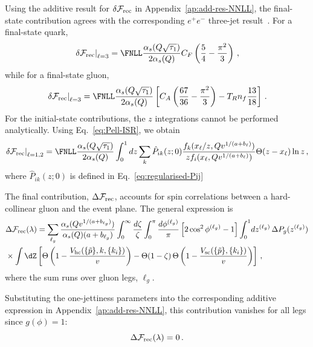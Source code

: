 Using the additive result for $\delta\mathcal{F}_{\rm rec}$ in
Appendix~\ref{ap:add-res-NNLL}, the final-state contribution agrees
with the corresponding $e^+e^-$ three-jet result~\cite{Arpino:2019ozn}.
For a final-state quark,
\begin{equation}
  \label{eq:dFrec-tau_1q}
  \left.\delta\mathcal{F}_{\rm rec}\right|_{\ell=3}
  =
  \FNLL
  \frac{\alpha_s(Q\sqrt{\tau_1})}{2\alpha_s(Q)}
  C_F\left(\frac{5}{4}-\frac{\pi^2}{3}\right)\,,
\end{equation}
while for a final-state gluon,
\begin{equation}
  \label{eq:dFrec-tau_1g}
  \left.\delta\mathcal{F}_{\rm rec}\right|_{\ell=3}
  =
  \FNLL
  \frac{\alpha_s(Q\sqrt{\tau_1})}{2\alpha_s(Q)}
  \left[
  C_A\left(\frac{67}{36}-\frac{\pi^2}{3}\right)
  -T_Rn_f\frac{13}{18}
  \right]\,.
\end{equation}
For the initial-state contributions, the $z$ integrations cannot
be performed analytically. Using Eq.~\eqref{eq:Pell-ISR}, we obtain
\begin{equation}
  \label{eq:dFrec-ISR-1jet}
  \left.\delta\mathcal{F}_{\rm rec}\right|_{\ell=1,2}
  =
  \FNLL
  \frac{\alpha_s(Q\sqrt{\tau_1})}{2\alpha_s(Q)}
  \int_0^1 dz \sum_k \hat P_{ik}(z;0)
  \frac{f_k(x_\ell/z,Qv^{1/(a+b_\ell)})}
  {z f_i(x_\ell,Qv^{1/(a+b_\ell)})}
  \Theta(z-x_\ell)\ln z\,,
\end{equation}
where $\hat P_{ik}(z;0)$ is defined in Eq.~\eqref{eq:regularised-Pij}

The final contribution, $\Delta\mathcal{F}_{\rm rec}$, 
accounts for spin correlations between a hard-collinear gluon 
and the event plane. The general expression is
\begin{equation}
\label{eq:DFrec-general}
\begin{aligned}
  &\Delta\mathcal{F}_{\mathrm{rec}}(\lambda) =
\sum_{\ell_g}\frac{\alpha_s(Qv^{1/(a+b_{\ell_g})})}{\alpha_s(Q)(a+b_{\ell_g})}\int_0^\infty \frac{d\zeta}{\zeta}
\int_0^\pi \frac{d\phi^{({\ell}_{g})}}{\pi}\left[2\cos^2\phi^{(\ell_g)} - 1\right]
\int_0^1\!dz^{({\ell}_{g})}\,
\Delta P_g(z^{(\ell_g)})
\\
& \times \int \dZ \left[
\Theta\left(1 - \frac{V_{\mathrm{hc}}(\{\tilde{p}\},k,\{k_i\})}{v}\right)
- \Theta(1-\zeta)\,
\Theta\left(1 - \frac{V_{\mathrm{sc}}(\{\tilde{p}\},\{k_i\})}{v}\right)
\right]\,,
\end{aligned}
\end{equation}
where the sum runs over gluon legs, $\ell_g$.

Substituting the one-jettiness parameters into the corresponding
additive expression in Appendix~\ref{ap:add-res-NNLL}, this contribution
vanishes for all legs since $g(\phi)=1$:
\begin{equation}
  \Delta\mathcal{F}_{\rm rec}(\lambda)=0\,.
\end{equation}

